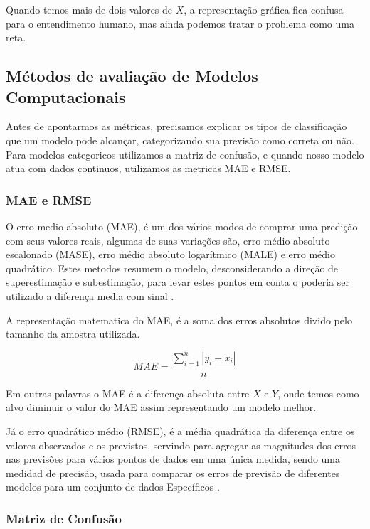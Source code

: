 \documentclass[
    12pt,               %
    openright,          %
    oneside,            %
    a4paper,            %
    english,            %
    brazil              %
    ]{abntex2}
\begin{document}
Quando temos mais de dois valores de $X$, a representação gráfica fica confusa para o entendimento humano,
mas ainda podemos tratar o problema como uma reta.

\subsection{Métodos de avaliação de Modelos Computacionais}

Antes de apontarmos as métricas, precisamos explicar os tipos de classificação que um modelo pode alcançar,
categorizando sua previsão como correta ou não. Para modelos categoricos utilizamos a matriz de confusão, e
quando nosso modelo atua com dados continuos, utilizamos as metricas MAE e RMSE. 

\subsubsection{MAE e RMSE}
O erro medio absoluto (MAE), é um dos vários modos de comprar uma predição com seus valores reais, algumas de suas
variações são, erro médio absoluto escalonado (MASE), erro médio absoluto logarítmico (MALE) e erro médio quadrático.
Estes metodos resumem o modelo, desconsiderando a direção de superestimação e subestimação, para levar estes pontos
em conta o poderia ser utilizado a diferença media com sinal \cite{mae&rmse}.

A representação matematica do MAE, é a soma dos erros absolutos divido pelo tamanho da amostra utilizada.

\begin{equation}
    \label{eq:mae}
    MAE = \frac{\sum_{i=1}^{n}|y_i - x_i|}{n}
\end{equation}

Em outras palavras o MAE é a diferença absoluta entre $X$ e $Y$, onde temos como alvo diminuir o valor do MAE
assim representando um modelo melhor.

Já o erro quadrático médio (RMSE), é a média quadrática da diferença entre os valores observados e os previstos,
servindo para agregar as magnitudes dos erros nas previsões para vários pontos de dados em uma única medida, sendo
uma medidad de precisão, usada para comparar os erros de previsão de diferentes modelos para um conjunto de 
dados Específicos \cite{rmse}.

\subsubsection{Matriz de Confusão}
\end{document}
